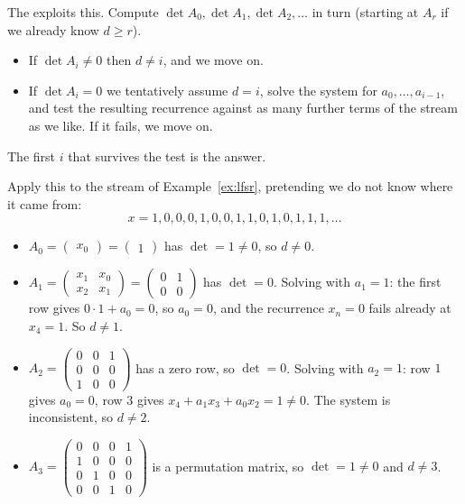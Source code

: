 \documentclass[a4paper]{scrartcl}
\begin{document}
The  exploits this. Compute $\det A_0, \det A_1, \det A_2, \dots$ in turn (starting at $A_r$ if we already know $d \ge r$).
\begin{itemize}
	\item If $\det A_i \ne 0$ then $d \ne i$, and we move on.
	\item If $\det A_i = 0$ we tentatively assume $d = i$, solve the system for $a_0,\dots,a_{i-1}$, and test the resulting recurrence against as many further terms of the stream as we like. If it fails, we move on.
\end{itemize}
The first $i$ that survives the test is the answer.

\begin{example}
	Apply this to the stream of Example~\ref{ex:lfsr}, pretending we do not know where it came from:
	$$x = 1,0,0,0,1,0,0,1,1,0,1,0,1,1,1,\dots$$
	\begin{itemize}
		\item $A_0 = \begin{pmatrix}x_0\end{pmatrix} = \begin{pmatrix}1\end{pmatrix}$ has $\det = 1 \ne 0$, so $d \ne 0$.
		\item $A_1 = \begin{pmatrix}x_1 & x_0\\ x_2 & x_1\end{pmatrix} = \begin{pmatrix}0&1\\0&0\end{pmatrix}$ has $\det = 0$. Solving with $a_1 = 1$: the first row gives $0\cdot1 + a_0 = 0$, so $a_0 = 0$, and the recurrence $x_n = 0$ fails already at $x_4 = 1$. So $d \ne 1$.
		\item $A_2 = \begin{pmatrix}0&0&1\\0&0&0\\1&0&0\end{pmatrix}$ has a zero row, so $\det = 0$. Solving with $a_2=1$: row $1$ gives $a_0 = 0$, row $3$ gives $x_4 + a_1x_3+a_0x_2 = 1 \ne 0$. The system is inconsistent, so $d\ne2$.
		\item $A_3 = \begin{pmatrix}0&0&0&1\\1&0&0&0\\0&1&0&0\\0&0&1&0\end{pmatrix}$ is a permutation matrix, so $\det = 1\ne0$ and $d \ne 3$.

\end{itemize}
\end{example}
\end{document}

